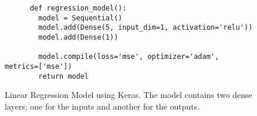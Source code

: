 \begin{figure}
  \begin{code}
    \begin{verbatim}
      def regression_model():
        model = Sequential()
        model.add(Dense(5, input_dim=1, activation='relu'))
        model.add(Dense(1))

        model.compile(loss='mse', optimizer='adam', metrics=['mse'])
        return model
    \end{verbatim}
    \caption{Linear Regression Model using Keras. The model contains two dense layers; one for the inputs and another for the outputs.}
    \label{code:regression_model}
  \end{code}
\end{figure}